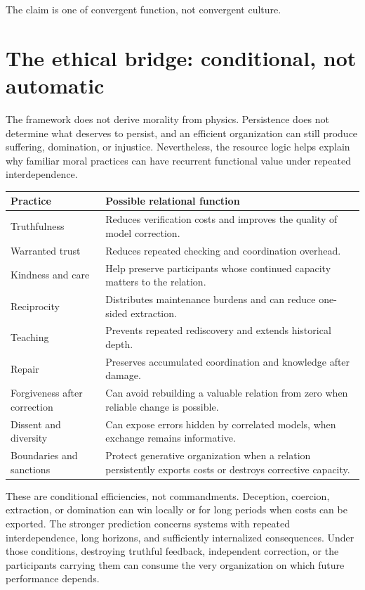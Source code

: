 \documentclass[11pt,a4paper]{article}
\begin{document}
The claim is one of convergent function, not convergent culture.

\section{The ethical bridge: conditional, not automatic}

The framework does not derive morality from physics. Persistence does not determine what deserves to persist, and an efficient organization can still produce suffering, domination, or injustice. Nevertheless, the resource logic helps explain why familiar moral practices can have recurrent functional value under repeated interdependence.

\begin{center}
\begin{tabular}{p{}p{}}
\toprule
\textbf{Practice} & \textbf{Possible relational function} \\
\midrule
Truthfulness & Reduces verification costs and improves the quality of model correction. \\
Warranted trust & Reduces repeated checking and coordination overhead. \\
Kindness and care & Help preserve participants whose continued capacity matters to the relation. \\
Reciprocity & Distributes maintenance burdens and can reduce one-sided extraction. \\
Teaching & Prevents repeated rediscovery and extends historical depth. \\
Repair & Preserves accumulated coordination and knowledge after damage. \\
Forgiveness after correction & Can avoid rebuilding a valuable relation from zero when reliable change is possible. \\
Dissent and diversity & Can expose errors hidden by correlated models, when exchange remains informative. \\
Boundaries and sanctions & Protect generative organization when a relation persistently exports costs or destroys corrective capacity. \\
\bottomrule
\end{tabular}
\end{center}

These are conditional efficiencies, not commandments. Deception, coercion, extraction, or domination can win locally or for long periods when costs can be exported. The stronger prediction concerns systems with repeated interdependence, long horizons, and sufficiently internalized consequences. Under those conditions, destroying truthful feedback, independent correction, or the participants carrying them can consume the very organization on which future performance depends.
\end{document}
